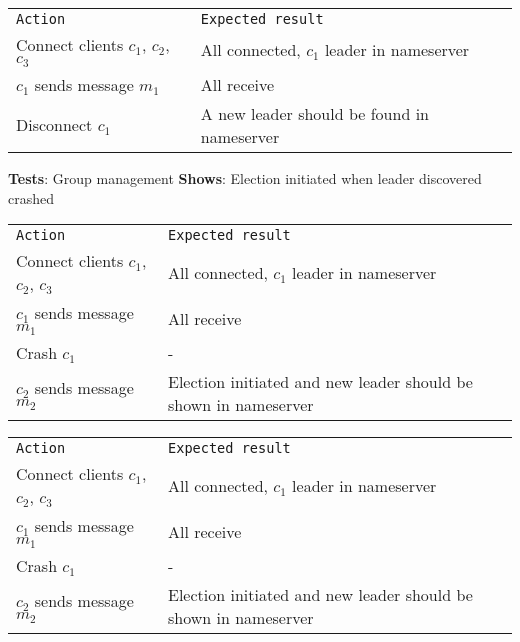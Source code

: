 	\begin{tabular}{ll}
		\texttt{Action} & \texttt{Expected result} \\
		Connect clients $c_1$, $c_2$, $c_3$ & All connected, $c_1$ leader in nameserver \\
		$c_1$ sends message $m_1$ & All receive \\
		Disconnect $c_1$ & A new leader should be found in nameserver \\
	\end{tabular}

	\textbf{Tests}: Group management
	\textbf{Shows}: Election initiated when leader discovered crashed \\

	\begin{tabular}{ll}
		\texttt{Action} & \texttt{Expected result} \\
		Connect clients $c_1$, $c_2$, $c_3$ & All connected, $c_1$ leader in nameserver \\
		$c_1$ sends message $m_1$ & All receive \\
		Crash $c_1$ & - \\
		$c_2$ sends message $m_2$ & Election initiated and new leader should be shown in nameserver \\
	\end{tabular}

	\begin{tabular}{ll}
		\texttt{Action} & \texttt{Expected result} \\
		Connect clients $c_1$, $c_2$, $c_3$ & All connected, $c_1$ leader in nameserver \\
		$c_1$ sends message $m_1$ & All receive \\
		Crash $c_1$ & - \\
		$c_2$ sends message $m_2$ & Election initiated and new leader should be shown in nameserver \\
	\end{tabular}









